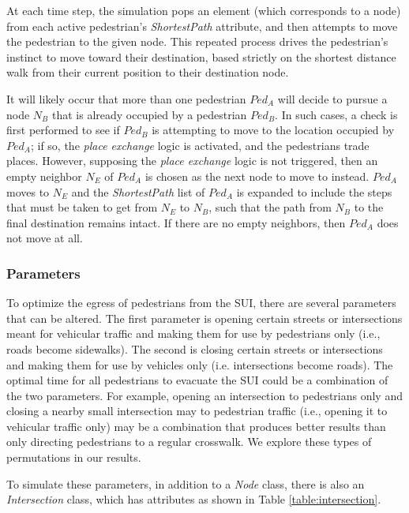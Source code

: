 \documentclass[12pt]{article}
\begin{document}
At each time step, the simulation pops an element (which corresponds to a node)
from each active pedestrian's \textit{ShortestPath} attribute, and then attempts
to move the pedestrian to the given node. This repeated process drives the
pedestrian's instinct to move toward their destination, based strictly on the
shortest distance walk from their current position to their destination node.

It will likely occur that more than one pedestrian $Ped_A$ will decide to pursue
a node $N_B$ that is already occupied by a pedestrian $Ped_B$. In such cases, a
check is first performed to see if $Ped_B$ is attempting to move to the location
occupied by $Ped_A$; if so, the \textit{place exchange} logic
\cite{blue2001cellular}
is activated, and the pedestrians trade places. However, supposing the
\textit{place exchange} logic is not triggered, then an empty neighbor $N_E$ of
$Ped_A$ is chosen as the next node to move to instead. $Ped_A$ moves to $N_E$ and
the \textit{ShortestPath} list of $Ped_A$ is expanded to include the steps
that must be taken to get from $N_E$ to $N_B$, such that the path from $N_B$ to
the final destination remains intact.  If there are no empty neighbors, then
$Ped_A$ does not move at all.

\subsubsection{Parameters}

To optimize the egress of pedestrians from the SUI, there are
several parameters that can be altered. The first parameter is opening certain
streets or intersections meant for vehicular traffic and making them for use by
pedestrians only (i.e., roads become sidewalks). The second is closing certain
streets or intersections and making them for use by vehicles only (i.e.
intersections become roads). The optimal time for all pedestrians to evacuate
the SUI could be a combination of the two parameters. For example, opening an
intersection to pedestrians only and closing a nearby small intersection may to
pedestrian traffic (i.e., opening it to vehicular traffic only) may be a
combination that produces better results than only directing pedestrians to a
regular crosswalk. We explore these types of permutations in our results.

To simulate these parameters, in addition to a \textit{Node} class, there is
also an \textit{Intersection} class, which has attributes as shown in Table
\ref{table:intersection}.
\end{document}
